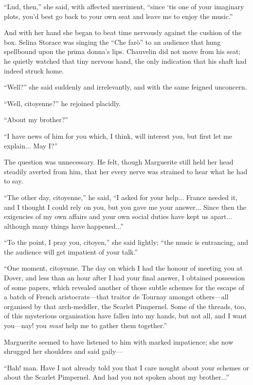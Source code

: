 \documentclass[paper=5.5in:8.5in,BCOR=7mm,twoside,DIV=calc,12pt,usegeometry,chapterprefix,endperiod,headings=big]{scrbook}
\begin{document}
\enquote{Lud, then,} she said, with affected merriment, \enquote{since `tis one of your imaginary plots, you'd best go back to your own seat and leave me to enjoy the music.}

And with her hand she began to beat time nervously against the cushion of the box. Selina Storace was singing the \enquote{Che farò} to an audience that hung spellbound upon the prima donna's lips. Chauvelin did not move from his seat; he quietly watched that tiny nervous hand, the only indication that his shaft had indeed struck home.

\enquote{Well?} she said suddenly and irrelevantly, and with the same feigned unconcern.

\enquote{Well, citoyenne?} he rejoined placidly.

\enquote{About my brother?}

\enquote{I have news of him for you which, I think, will interest you, but first let me explain... May I?}

The question was unnecessary. He felt, though Marguerite still held her head steadily averted from him, that her every nerve was strained to hear what he had to say.

\enquote{The other day, citoyenne,} he said, \enquote{I asked for your help... France needed it, and I thought I could rely on you, but you gave me your answer... Since then the exigencies of my own affairs and your own social duties have kept us apart... although many things have happened...}

\enquote{To the point, I pray you, citoyen,} she said lightly; \enquote{the music is entrancing, and the audience will get impatient of your talk.}

\enquote{One moment, citoyenne. The day on which I had the honour of meeting you at Dover, and less than an hour after I had your final answer, I obtained possession of some papers, which revealed another of those subtle schemes for the escape of a batch of French aristocrats---that traitor de Tournay amongst others---all organised by that arch-meddler, the Scarlet Pimpernel. Some of the threads, too, of this mysterious organisation have fallen into my hands, but not all, and I want you---nay! you \textit{must} help me to gather them together.}

Marguerite seemed to have listened to him with marked impatience; she now shrugged her shoulders and said gaily---

\enquote{Bah! man. Have I not already told you that I care nought about your schemes or about the Scarlet Pimpernel. And had you not spoken about my brother...}
\end{document}
